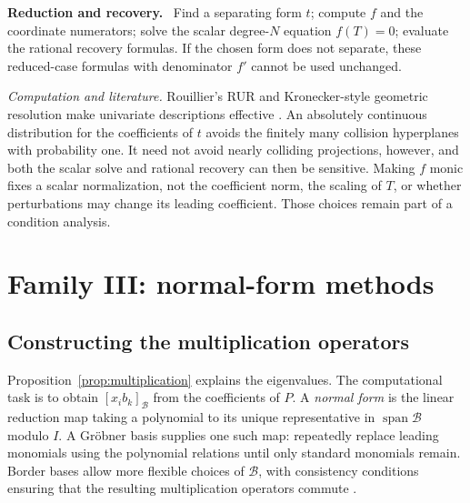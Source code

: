 \documentclass[12pt]{article}
\def\B{\mathcal{B}}
\DeclareMathOperator{\spanop}{span}
\theoremstyle{definition}
\theoremstyle{remark}
\newenvironment{reduction}
  {\par\medskip\noindent\textbf{Reduction and recovery.}\ }
  {\par\medskip}
\begin{document}
\begin{reduction}
Find a separating form $t$; compute $f$ and the coordinate numerators; solve the scalar
degree-$N$ equation $f(T)=0$; evaluate the rational recovery formulas. If the chosen
form does not separate, these reduced-case formulas with denominator $f'$ cannot
be used unchanged.
\end{reduction}

\emph{Computation and literature.} Rouillier's RUR and Kronecker-style geometric
resolution make univariate descriptions effective
\cite{rouillier1999solving,giusti2001grobner,kronecker1882grundzuge}. An absolutely
continuous distribution for the coefficients of $t$ avoids the finitely many collision
hyperplanes with probability one. It need not avoid nearly colliding projections,
however, and both the scalar
solve and rational recovery can then be sensitive. Making $f$ monic fixes a scalar
normalization, not the coefficient norm, the scaling of $T$, or whether perturbations
may change its leading coefficient. Those choices remain part of a condition analysis.
\section{Family III: normal-form methods}\label{sec:familyIII}
\subsection{Constructing the multiplication operators}\label{sec:normalform}

Proposition~\ref{prop:multiplication} explains the eigenvalues. The computational
task is to obtain $[x_i b_k]_\B$ from the coefficients of $P$. A \emph{normal form}
is the linear reduction map taking a polynomial to its unique representative in
$\spanop\B$ modulo $I$. A Gr\"obner basis supplies one such map: repeatedly replace
leading monomials using the polynomial relations until only standard monomials
remain. Border bases allow more flexible choices of $\B$, with consistency conditions
ensuring that the resulting multiplication operators commute
\cite{mourrain1999criterion,elkadi2007introduction}.
\end{document}
